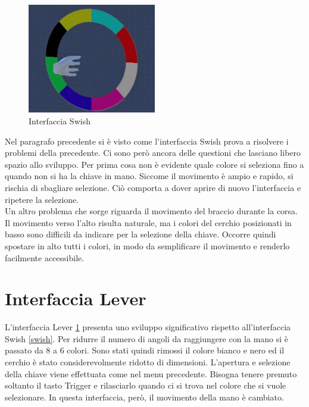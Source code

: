 \documentclass[target=bach,aauheader=]{thud}
\begin{document}
\begin{figure}[h]
    \centering
    \includegraphics[width=0.50\textwidth]{swish}
    \caption{Interfaccia Swish}
    \label{fig:swish}
\end{figure}

Nel paragrafo precedente si è visto come l'interfaccia Swish prova a risolvere i problemi della precedente.
Ci sono però ancora delle questioni che lasciano libero spazio allo sviluppo.
Per prima cosa non è evidente quale colore si seleziona fino a quando non si ha la chiave in mano.
Siccome il movimento è ampio e rapido, si rischia di sbagliare selezione.
Ciò comporta a dover aprire di nuovo l'interfaccia e ripetere la selezione. \\

Un altro problema che sorge riguarda il movimento del braccio durante la corsa.
Il movimento verso l'alto risulta naturale, ma i colori del cerchio posizionati in basso sono difficili da indicare per la selezione della chiave.
Occorre quindi spostare in alto tutti i colori, in modo da semplificare il movimento e renderlo facilmente accessibile. 

\section{Interfaccia Lever}
\label{lever}
L'interfaccia Lever \ref{lever} presenta uno sviluppo significativo rispetto all'interfaccia Swish \ref{swish}.
Per ridurre il numero di angoli da raggiungere con la mano si è passato da 8 a 6 colori. 
Sono stati quindi rimossi il colore bianco e nero ed il cerchio è stato considerevolmente ridotto di dimensioni.
L'apertura e selezione della chiave viene effettuata come nel menu precedente.
Bisogna tenere premuto soltanto il tasto Trigger e rilasciarlo quando ci si trova nel colore che si vuole selezionare.
In questa interfaccia, però, il movimento della mano è cambiato. \\
\end{document}
